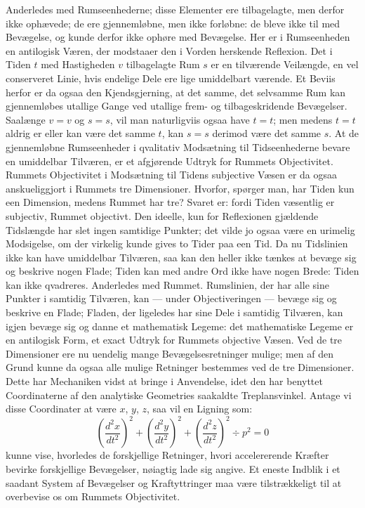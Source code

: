 \documentclass[12pt]{book}
\newcommand{\opage}[1]{\marginnote{\footnotesize\textit{[#1]}}}
\begin{document}
Anderledes med Rumseenhederne; disse Elementer ere tilbagelagte, men derfor ikke
ophævede; de ere gjennemløbne, men ikke forløbne: de bleve ikke til med Bevægelse, og
kunde derfor ikke ophøre med Bevægelse. Her er i Rumseenheden en antilogisk Væren, der
modstaaer den i Vorden herskende Reflexion. Det i Tiden $t$ med Hastigheden $v$
tilbagelagte Rum $s$ er en tilværende Veilængde, en vel conserveret Linie, hvis endelige
Dele ere lige umiddelbart værende. Et Beviis herfor er da ogsaa den Kjendsgjerning, at det
samme, det selvsamme Rum kan gjennemløbes utallige Gange ved utallige frem- og
tilbageskridende Bevægelser. Saalænge $v = v$ og $s = s$, vil man naturligviis ogsaa have
$t = t$; men medens $t = t$ aldrig er eller kan være det samme $t$, kan $s = s$ derimod
være det samme $s$. At de gjennemløbne Rumseenheder i qvalitativ Modsætning til
Tidseenhederne bevare en umiddelbar Tilværen, er et afgjørende Udtryk for Rummets
Objectivitet. Rummets Objectivitet i Modsætning til Tidens subjective Væsen er da ogsaa
anskueliggjort i Rummets tre Dimensioner. Hvorfor, spørger man, har Tiden kun een
Dimension, medens Rummet har tre? Svaret er: fordi Tiden væsentlig er subjectiv, Rummet
objectivt. Den ideelle,
\opage{348} kun for Reflexionen gjældende Tidslængde har slet ingen samtidige Punkter; det vilde jo
ogsaa være en urimelig Modsigelse, om der virkelig kunde gives to Tider paa een Tid. Da nu
Tidslinien ikke kan have umiddelbar Tilværen, saa kan den heller ikke tænkes at bevæge sig
og beskrive nogen Flade; Tiden kan med andre Ord ikke have nogen Brede: Tiden kan ikke
qvadreres. Anderledes med Rummet. Rumslinien, der har alle sine Punkter i samtidig
Tilværen, kan — under Objectiveringen — bevæge sig og beskrive en Flade; Fladen, der
ligeledes har sine Dele i samtidig Tilværen, kan igjen bevæge sig og danne et mathematisk
Legeme: det mathematiske Legeme er en antilogisk Form, et exact Udtryk for Rummets
objective Væsen. Ved de tre Dimensioner ere nu uendelig mange Bevægelsesretninger mulige;
men af den Grund kunne da ogsaa alle mulige Retninger bestemmes ved de tre Dimensioner.
Dette har Mechaniken vidst at bringe i Anvendelse, idet den har benyttet Coordinaterne af
den analytiske Geometries saakaldte Treplansvinkel. Antage vi disse Coordinater at være
$x$, $y$, $z$, saa vil en Ligning som:
\[ \left(\frac{d^{2}x}{dt^{2}}\right)^{2} + \left(\frac{d^{2}y}{dt^{2}}\right)^{2}
   + \left(\frac{d^{2}z}{dt^{2}}\right)^{2} \div p^{2} = 0 \]
kunne vise, hvorledes de forskjellige Retninger, hvori accelererende Kræfter bevirke
forskjellige Bevægelser, nøiagtig lade sig angive. Et eneste Indblik i et saadant System
af Bevægelser og Kraftyttringer maa være tilstrækkeligt til at overbevise os om Rummets
Objectivitet.
\end{document}
